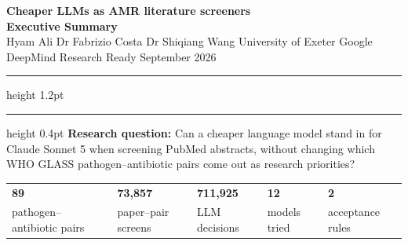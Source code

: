 \documentclass[10pt]{article}
\begin{document}
\begin{center}
{\selectfont\bfseries\LARGE Cheaper LLMs as AMR literature screeners}\\[2pt]
{\selectfont\bfseries\large Executive Summary}\\[4pt]
{\small Hyam Ali \textperiodcentered{} Dr Fabrizio Costa \textperiodcentered{} Dr Shiqiang Wang   \enspace\textbar\enspace   University of Exeter \textperiodcentered{} Google DeepMind Research Ready   \enspace\textbar\enspace   September 2026}
\end{center}
\vspace{-4pt}\hrule height 1.2pt\vspace{1pt}\hrule height 0.4pt
\vspace{6pt}
\textbf{Research question:} Can a cheaper language model stand in for Claude Sonnet 5 when screening PubMed abstracts, without changing which WHO GLASS pathogen--antibiotic pairs come out as research priorities?

\vspace{2pt}
{\renewcommand{\arraystretch}{1.25}
\begin{tabularx}{\linewidth}{|*{5}{>{\centering\arraybackslash}X|}}
\hline
\textbf{\large 89} & \textbf{\large 73,857} & \textbf{\large 711,925} & \textbf{\large 12} & \textbf{\large 2} \\
\small pathogen--antibiotic pairs & \small paper--pair screens & \small LLM decisions & \small models tried & \small acceptance rules \\
\hline
\end{tabularx}}
\end{document}
